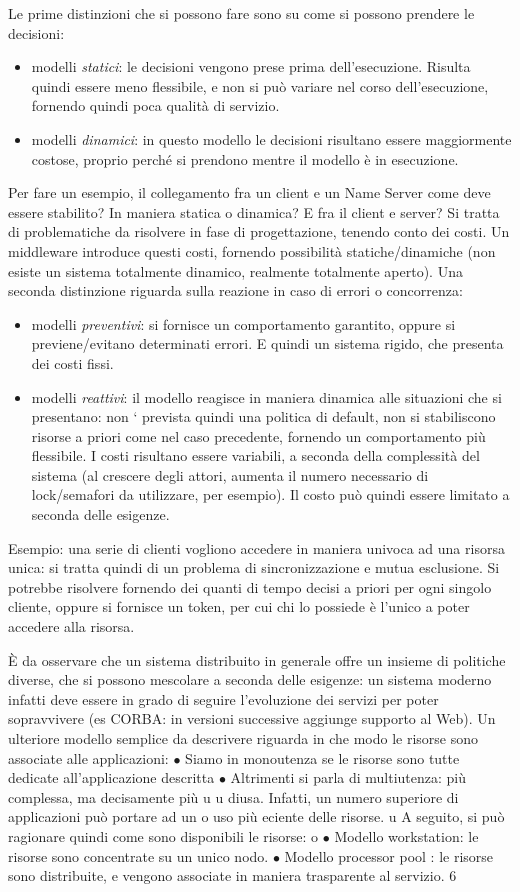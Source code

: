 \documentclass[a4paper,12pt]{article}
\begin{document}
Le prime distinzioni che si possono fare sono su come si possono prendere le decisioni:
\begin{itemize}
 \item modelli \textit{statici}: le decisioni vengono prese prima dell'esecuzione. Risulta quindi essere meno
flessibile, e non si può variare nel corso dell'esecuzione, fornendo quindi poca qualità di servizio.
\item modelli \textit{dinamici}: in questo modello le decisioni risultano essere maggiormente costose, proprio perché 
si prendono mentre il modello è in esecuzione.
\end{itemize}
Per fare un esempio, il collegamento fra un client e un Name Server come deve essere stabilito? In maniera statica o
dinamica? E fra il client e server? Si tratta di problematiche da risolvere in fase di progettazione, tenendo conto 
dei costi. Un middleware introduce questi costi, fornendo possibilità statiche/dinamiche (non esiste un sistema
totalmente dinamico, realmente totalmente aperto).
Una seconda distinzione riguarda sulla reazione in caso di errori o concorrenza:
\begin{itemize}
 \item modelli \textit{preventivi}: si fornisce un comportamento garantito, oppure si previene/evitano determinati
errori. E quindi un sistema rigido, che presenta dei costi fissi.
\item modelli \textit{reattivi}: il modello reagisce in maniera dinamica alle situazioni che si presentano: non `
prevista quindi una politica di default, non si stabiliscono risorse a priori come nel caso precedente, fornendo un
comportamento più flessibile. I costi risultano essere variabili, a seconda della complessità del sistema (al crescere
degli attori, aumenta il numero necessario di lock/semafori da utilizzare, per esempio). Il costo può quindi essere
limitato a seconda delle esigenze. 
\end{itemize}
Esempio: una serie di clienti vogliono accedere in maniera univoca ad una risorsa unica: si tratta quindi di un problema
di sincronizzazione e mutua esclusione.
Si potrebbe risolvere fornendo dei quanti di tempo decisi a priori per ogni singolo cliente, oppure si fornisce un
token, per cui chi lo possiede è l'unico a poter accedere alla risorsa.

È da osservare che un sistema distribuito in generale offre un insieme di politiche diverse, che si possono mescolare a
seconda delle esigenze: un sistema moderno infatti deve essere in grado di seguire l'evoluzione dei servizi per poter
sopravvivere (es CORBA: in versioni successive aggiunge supporto al Web).
Un ulteriore modello semplice da descrivere riguarda in che modo le risorse
sono associate alle applicazioni:
$\bullet$ Siamo in monoutenza se le risorse sono tutte dedicate all'applicazione
descritta
$\bullet$ Altrimenti si parla di multiutenza: più complessa, ma decisamente più
u
u
diusa. Infatti, un numero superiore di applicazioni può portare ad un
o
uso più eciente delle risorse.
u
A seguito, si può ragionare quindi come sono disponibili le risorse:
o
$\bullet$ Modello workstation: le risorse sono concentrate su un unico nodo.
$\bullet$ Modello processor pool : le risorse sono distribuite, e vengono associate in
maniera trasparente al servizio.
6
\end{document}
